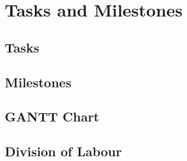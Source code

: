 %
%
%
%

\section{Tasks and Milestones}

\subsection{Tasks}
\subsection{Milestones}
\subsection{GANTT Chart}
\subsection{Division of Labour}
